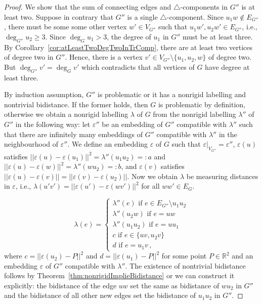 \documentclass[a4paper, 11pt]{article}
\newcommand{\trcomp}{$\triangle$-component}
\newcommand{\trcomps}{$\triangle$-components}
\newcommand{\RR}{\mathbb{R}}
\theoremstyle{definition}
\begin{document}
\begin{proof}
We show that the sum of connecting edges and \trcomps{} in $G''$ is at least two. Suppose in contrary that $G''$ is a single \trcomp{}. Since $u_1w\notin E_{G''}$, there must be some some other vertex $w'\in V_{G''}$ such that $u_1w',u_2w'\in E_{G''}$, i.e., $\deg_{G''} u_2 \geq 3$. Since $\deg_G u_1>3$, the degree of $u_1$ in $G''$ must be at least three. By Corollary~\ref{cor:atLeastTwoDegTwoInTrComp}, there are at least two vertices of degree two in $G''$. Hence, there is a vertex $v'\in V_{G''}\setminus\{u_1,u_2,w\}$ of degree two. But $\deg_{G''}v'=\deg_G v'$ which contradicts that all vertices of $G$ have degree at least three. 

By induction assumption, $G''$ is problematic or it has a nonrigid labelling and nontrivial bidistance. If the former holds, then $G$ is problematic by definition, otherwise we obtain a nonrigid labelling $\lambda$ of $G$ from the nonrigid labelling $\lambda''$ of $G''$ in the following way: let $\varepsilon''$ be an embedding of $G''$ compatible with $\lambda''$ such that there are infinitely many embeddings of $G''$ compatible with $\lambda''$ in the neighbourhood of $\varepsilon''$. We define an embedding $\varepsilon$ of $G$ such that $\varepsilon|_{V_{G''}}=\varepsilon''$, $\varepsilon(u)$ satisfies $||\varepsilon(u)-\varepsilon(u_1)||^2=\lambda''(u_1u_2)=:a$ and $||\varepsilon(u)-\varepsilon(w)||^2=\lambda''(wu_2)=:b$, and $\varepsilon(v)$ satisfies $||\varepsilon(u)-\varepsilon(v)|| =||\varepsilon(v)-\varepsilon(u_2)||$. Now we obtain $\lambda$ be measuring distances in $\varepsilon$, i.e., $\lambda(u'v')=||\varepsilon(u')-\varepsilon(wv')||^2$ for all $ww'\in E_G$.



$$
\lambda(e)=\begin{cases}
\lambda''(e) \text{ if } e\in E_{G''}\setminus u_1u_2\\
\lambda''(u_2w) \text{ if } e=uw\\
\lambda''(u_1u_2) \text{ if } e=uu_1\\
c \text{ if } e\in\{uv,u_2v\}\\
d \text{ if } e=u_1v\,,
\end{cases}
$$
where $c=||\varepsilon(u_2)-P||^2$ and $d=||\varepsilon(u_1)-P||^2$ for some point $P\in\RR^2$ and an embedding $\varepsilon$ of $G''$ compatible with $\lambda''$. The existence of nontrivial bidistance follows by Theorem~\ref{thm:nonrigidImplieBidistance} or we can construct it explicitly: the bidistance of the edge $uw$ set the same as bidistance of $wu_2$ in $G''$ and the bidistance of all other new edges set the bidistance of $u_1u_2$ in $G''$.


\end{proof}
\end{document}
